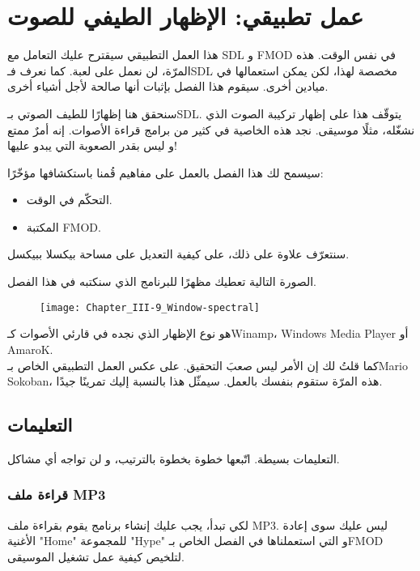 \chapter{عمل تطبيقي: الإظهار الطيفي للصوت}

هذا العمل التطبيقي سيقترح عليك التعامل مع \textenglish{SDL}
و \textenglish{FMOD}
في نفس الوقت. هذه المرّة، لن نعمل على لعبة. كما نعرف فـ\textenglish{SDL}
مخصصة لهذا، لكن يمكن استعمالها في ميادين أخرى. سيقوم هذا الفصل بإثبات أنها صالحة لأجل أشياء أخرى.

سنحقق هنا إظهارًا للطيف الصوتي بـ\textenglish{SDL}.
يتوقّف هذا على إظهار تركيبة الصوت الذي نشغّله، مثلًا موسيقى. نجد هذه الخاصية في كثير من برامج قراءة الأصوات. إنه أمرٌ ممتع و ليس بقدر الصعوبة التي يبدو عليها!

سيسمح لك هذا الفصل بالعمل على مفاهيم قُمنا باستكشافها مؤخّرًا:

\begin{itemize}
	\item التحكّم في الوقت.
	\item المكتبة 
	\textenglish{FMOD}.
\end{itemize}

سنتعرّف علاوة على ذلك، على كيفية التعديل على مساحة بيكسلا ببيكسل.

الصورة التالية تعطيك مظهرًا للبرنامج الذي سنكتبه في هذا الفصل.

\begin{figure}[H]
	\centering
	\texttt{[image: Chapter\_III-9\_Window-spectral]}
\end{figure}

هو نوع الإظهار الذي نجده في قارئي الأصوات كـ\textenglish{Winamp}،
\textenglish{Windows Media Player} أو \textenglish{AmaroK}.\\
كما قلتُ لك إن الأمر ليس صعبَ التحقيق. على عكس العمل التطبيقي الخاص بـ\textenglish{Mario Sokoban}،
هذه المرّة ستقوم بنفسك بالعمل. سيمثّل هذا بالنسبة إليك تمرينًا جيدًا.

\section{التعليمات}

التعليمات بسيطة. اتّبعها خطوة بخطوة بالترتيب، و لن تواجه أي مشاكل.

\subsection{قراءة ملف \textenglish{MP3}}

لكي تبدأ، يجب عليك إنشاء برنامج يقوم بقراءة ملف
\textenglish{MP3}. ليس عليك سوى إعادة
الأغنية 
"\textenglish{Home}"
للمجموعة
"\textenglish{Hype}"
و التي استعملناها في الفصل الخاص بـ\textenglish{FMOD}
لتلخيص كيفية عمل تشغيل الموسيقى.

